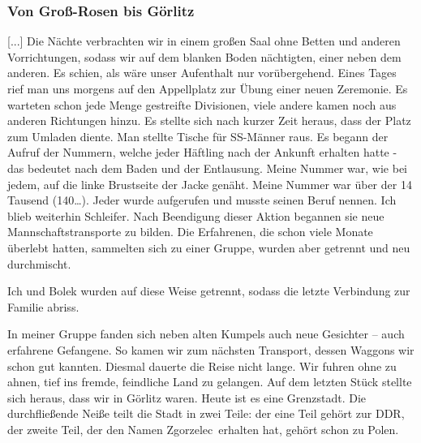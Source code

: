 \documentclass[a4paper,12pt,ngerman,
]{nisebook}
\begin{document}
\subsubsection*{Von Groß-Rosen bis Görlitz}
[...]
Die Nächte verbrachten wir in einem großen Saal ohne Betten und anderen Vorrichtungen, sodass wir auf dem blanken Boden nächtigten, einer neben dem anderen. Es schien, als wäre unser Aufenthalt nur vorübergehend. Eines Tages rief man uns morgens auf den Appellplatz zur Übung einer neuen Zeremonie. Es warteten schon jede Menge gestreifte Divisionen, viele andere kamen noch aus anderen Richtungen hinzu. Es stellte sich nach kurzer Zeit heraus, dass der Platz zum Umladen diente. Man stellte Tische für SS-Männer raus. Es begann der Aufruf der Nummern, welche jeder Häftling nach der Ankunft erhalten hatte - das bedeutet nach dem Baden und der Entlausung. Meine Nummer war, wie bei jedem, auf die linke Brustseite der Jacke  genäht. Meine Nummer war über der 14 Tausend (140\dots). Jeder wurde aufgerufen und musste seinen Beruf nennen. Ich blieb weiterhin Schleifer. Nach Beendigung dieser Aktion begannen sie neue Mannschaftstransporte zu bilden. Die Erfahrenen, die schon viele Monate überlebt hatten, sammelten sich zu einer Gruppe, wurden aber getrennt und neu durchmischt.

Ich und Bolek wurden auf diese Weise getrennt, sodass die letzte Verbindung zur Familie abriss.

In meiner Gruppe fanden sich neben alten Kumpels auch neue Gesichter -- auch erfahrene Gefangene. So kamen wir zum nächsten Transport, dessen Waggons wir schon gut kannten. Diesmal dauerte die Reise nicht lange. Wir fuhren ohne zu ahnen, tief ins fremde, feindliche Land zu gelangen. Auf dem letzten Stück stellte sich heraus, dass wir in Görlitz waren. Heute ist es eine Grenzstadt. Die durchfließende Neiße teilt die Stadt in zwei Teile: der eine Teil gehört zur DDR, der zweite Teil, der den Namen \glqq Zgorzelec\grqq~erhalten hat, gehört schon zu Polen.
\end{document}
